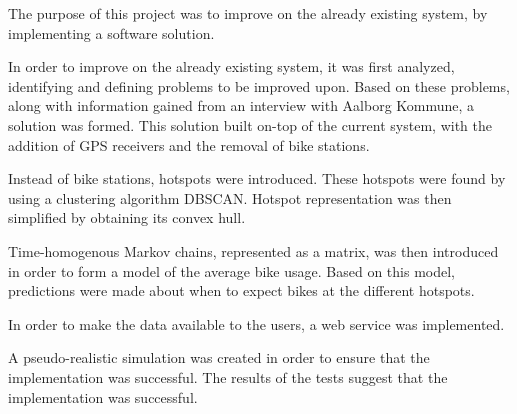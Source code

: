 The purpose of this project was to improve on the already existing \citybike system, by implementing a software solution.

In order to improve on the already existing \citybike system, it was first analyzed, identifying and defining problems to be improved upon.
Based on these problems, along with information gained from an interview with Aalborg Kommune, a solution was formed.
This solution built on-top of the current \citybike system, with the addition of GPS receivers and the removal of bike stations.

Instead of bike stations, hotspots were introduced.
These hotspots were found by using a clustering algorithm DBSCAN.
Hotspot representation was then simplified by obtaining its convex hull.

Time-homogenous Markov chains, represented as a matrix, was then introduced in order to form a model of the average bike usage.
Based on this model, predictions were made about when to expect bikes at the different hotspots.

In order to make the data available to the users, a web service was implemented.

A pseudo-realistic simulation was created in order to ensure that the implementation was successful.
The results of the tests suggest that the implementation was successful.